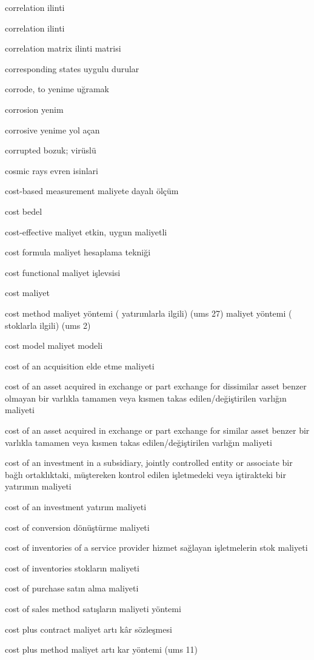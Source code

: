 \documentclass[12pt,fleqn]{article}\usepackage{../../common}
\begin{document}
correlation ilinti

correlation ilinti

correlation matrix ilinti matrisi

corresponding states uygulu durular

corrode, to yenime uğramak

corrosion yenim

corrosive yenime yol açan

corrupted bozuk; virüslü

cosmic rays evren isinlari

cost-based measurement maliyete dayalı ölçüm

cost bedel

cost-effective maliyet etkin, uygun maliyetli

cost formula maliyet hesaplama tekniği

cost functional maliyet işlevsisi

cost maliyet

cost method maliyet yöntemi ( yatırımlarla ilgili) (ums 27) maliyet yöntemi ( stoklarla ilgili) (ums 2)

cost model maliyet modeli

cost of an acquisition elde etme maliyeti

cost of an asset acquired in exchange or part exchange for dissimilar asset benzer olmayan bir varlıkla tamamen veya kısmen takas edilen/değiştirilen varlığın maliyeti

cost of an asset acquired in exchange or part exchange for similar asset benzer bir varlıkla tamamen veya kısmen takas edilen/değiştirilen varlığın maliyeti

cost of an investment in a subsidiary, jointly controlled entity or associate bir bağlı ortaklıktaki, müştereken kontrol edilen işletmedeki veya iştirakteki bir yatırımın maliyeti

cost of an investment yatırım maliyeti

cost of conversion dönüştürme maliyeti

cost of inventories of a service provider hizmet sağlayan işletmelerin stok maliyeti

cost of inventories stokların maliyeti

cost of purchase satın alma maliyeti

cost of sales method satışların maliyeti yöntemi

cost plus contract maliyet artı kâr sözleşmesi

cost plus method maliyet artı kar yöntemi (ums 11)
\end{document}
